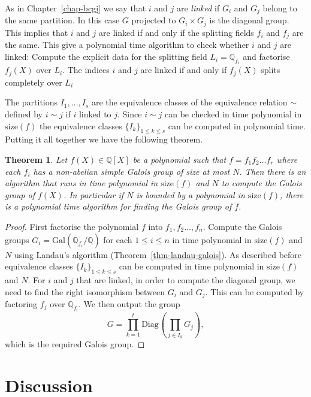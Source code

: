\documentclass[11pt]{madras}%
\newtheorem{theorem}{Theorem}[chapter]
\theoremstyle{remark}
\newcommand{\Gal}[1]{{\ensuremath{\mathrm{Gal}\left(#1\right)}}}
\newcommand{\size}[1]{{\ensuremath{\mathrm{size}\left(#1\right)}}}
\newcommand{\Diag}[2][]{{\ensuremath{\mathrm{Diag}_{{#1}}\left(#2\right)}}}
\newcommand{\bigtimes}{\prod}
\begin{document}
As in Chapter~\ref{chap-bcgi} we say that $i$ and $j$ are
\emph{linked} if $G_i$ and $G_j$ belong to the same partition. In this
case $G$ projected to $G_i \times G_j$ is the diagonal group. This
implies that $i$ and $j$ are linked if and only if the splitting
fields $f_i$ and $f_j$ are the same.  This give a polynomial time
algorithm to check whether $i$ and $j$ are linked: Compute the
explicit data for the splitting field $L_i = \mathbb{Q}_{f_i}$ and
factorise $f_j(X)$ over $L_i$. The indices $i$ and $j$ are linked if
and only if $f_j(X)$ splits completely over $L_i$

The partitions $I_1,\ldots,I_s$ are the equivalence classes of the
equivalence relation $\sim$ defined by $i \sim j$ if $i$ linked to
$j$.  Since $i \sim j$ can be checked in time polynomial in $\size{f}$
the equivalence classes $\{ I_k \}_{1 \leq k \leq s}$ can be computed
in polynomial time.  Putting it all together we have the following
theorem.

\begin{theorem}\label{thm-compute-galois-simple}
  Let $f(X) \in \mathbb{Q}[X]$ be a polynomial such that $f = f_1 f_2
  \ldots f_r$ where each $f_i$ has a non-abelian simple Galois group
  of size at most $N$. Then there is an algorithm that runs in time
  polynomial in $\size{f}$ and $N$ to compute the Galois group of
  $f(X)$.  In particular if $N$ is bounded by a polynomial in
  $\size{f}$, there is a polynomial time algorithm for finding the
  Galois group of $f$.
\end{theorem}
\begin{proof}
  First factorise the polynomial $f$ into $f_1, f_2 \ldots, f_n$.
  Compute the Galois groups $G_i = \Gal{\mathbb{Q}_{f_i}/\mathbb{Q}}$
  for each $1 \leq i \leq n$ in time polynomial in $\size{f}$ and $N$
  using Landau's algorithm (Theorem~\ref{thm-landau-galois}). As
  described before equivalence classes $\{ I_k \}_{1 \leq k \leq s}$
  can be computed in time polynomial in $\size{f}$ and $N$. For $i$
  and $j$ that are linked, in order to compute the diagonal group, we
  need to find the right isomorphism between $G_i$ and $G_j$. This can
  be computed by factoring $f_j$ over $\mathbb{Q}_{f_i}$. We then
  output the group
  \[
  G = \prod_{k=1}^t \Diag{ \bigtimes_{j \in I_k} G_j},
  \]
  which is the required Galois group.
\end{proof}

\section{Discussion}
\end{document}
